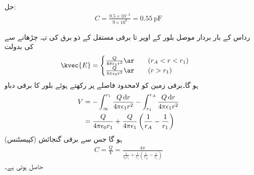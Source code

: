 حل: 
\begin{align*}
C=\frac{0.5 \times 10^{-2}}{9 \times 10^9}=\SI{0.55}{\pico \farad}
\end{align*}

 رداس کے بار بردار موصل بلور کے اوپر  تا  برقی مستقل  کے ذو برق کی تہہ چڑھانے سے  کی بدولت
\begin{align*}
\kvec{E}=
\begin{cases}
\frac{Q}{4\pi\epsilon_1 r^2}\ar  \quad \quad (r_A < r < r_1) \\
\frac{Q}{4\pi\epsilon_0 r^2}\ar \quad \quad  (r >r_1)
\end{cases}
\end{align*}
ہو گا۔برقی زمین کو لامحدود فاصلے پر رکھتے ہوئے بلور کا برقی دباو
\begin{align*}
V&=-\int_{\infty}^{r_1}\frac{Q \dif r}{4\pi\epsilon_1 r^2} -\int_{r_1}^{r_A}\frac{Q \dif r}{4\pi\epsilon_1 r^2}\\
&=\frac{Q}{4\pi\epsilon_0 r_1} +\frac{Q}{4\pi\epsilon_1} \left(\frac{1}{r_A}-\frac{1}{r_1} \right)
\end{align*}
ہو گا جس سے برقی گنجائش (کپیسٹنس)
\begin{align}
C=\frac{Q}{V}=\frac{4\pi}{\frac{1}{\epsilon_0 r_1}+\frac{1}{\epsilon_1} \left(\frac{1}{r_A}-\frac{1}{r_1} \right)}
\end{align}
حاصل ہوتی ہے۔

